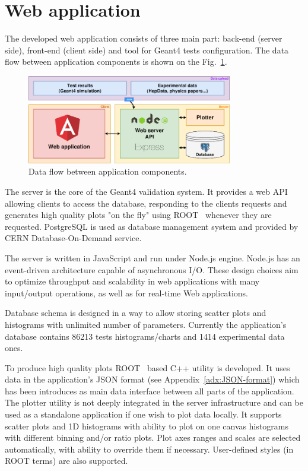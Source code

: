 \section{Web application}
\label{sec-webapplication}

The developed web application consists of three main part: back-end (server side), front-end (client side) and tool 
for Geant4 tests configuration. The data flow between application components is shown on the Fig.~\ref{fig:dataflow}.

\begin{figure}[h]
    \centering
    \includegraphics[width=0.8\textwidth,clip]{schema.png}
    \caption{Data flow between application components.}
    \label{fig:dataflow}
\end{figure}

The server is the core of the Geant4 validation system. It provides a web API allowing clients to access the database, responding to the clients requests and generates high quality plots "on the fly" using ROOT~\cite{ROOT} whenever they are requested. PostgreSQL is used as database management system and provided by CERN Database-On-Demand service.

The server is written in JavaScript and run under Node.js engine. Node.js has an event-driven architecture capable of asynchronous I/O. These design choices aim to optimize throughput and scalability in web applications with many input/output operations, as well as for real-time Web applications.

Database schema is designed in a way to allow storing scatter plots and histograms with unlimited number of parameters. Currently the application's database contains 86213 tests histograms/charts and 1414 experimental data ones.

To produce high quality plots ROOT~\cite{ROOT} based C++ utility is developed. It uses data in the application's JSON format (see Appendix~\ref{adx:JSON-format}) which has been introduces as main data interface between all parts of the application. The plotter utility is not deeply integrated in the server infrastructure and can be used as a standalone application if one wish to plot data locally. It supports scatter plots and 1D histograms with ability to plot on one canvas histograms with different binning and/or ratio plots. Plot axes ranges and scales are selected automatically, with ability to override them if necessary. User-defined styles (in ROOT terms) are also supported.

